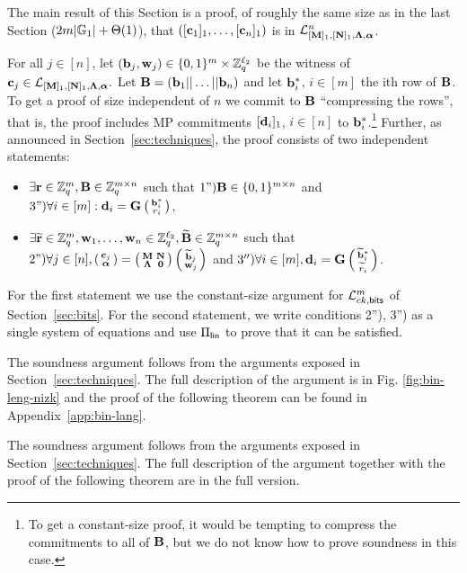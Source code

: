 The main result of this Section is a proof, of roughly the same size as in the last Section ($2{m}|\mathbb{G}_1|+\Theta(1)$), that  $([\mathbf{c}_1]_1,\ldots,[\mathbf{c}_n]_1)$ is in $\mathcal{L}_{[\mathbf{{M}}]_1,[\mathbf{{N}}]_1,\mathbf{{\Lambda}},{\boldsymbol \alpha}}^n$.

For all $j \in [n]$, let $(\mathbf{b}_j,\mathbf{w}_j) \in \{0,1\}^{{m}} \times \mathbb{Z}_q^{{\ell_2}}$ be the witness of $\mathbf{c}_j \in \mathcal{L}_{[\mathbf{{M}}]_1,[\mathbf{{N}}]_1,\mathbf{{\Lambda}},{\boldsymbol \alpha}}.$ Let $\mathbf{{B}}=(\mathbf{b}_1|| \ldots ||\mathbf{b}_n)$ and let $\mathbf{b}^*_{i}$, $i \in [m]$ the ith row of $\mathbf{{B}}$. To get a proof of size independent of $n$ we commit to $\mathbf{{B}}$ ``compressing the rows'', that is, the proof includes MP commitments $[\mathbf{d}_i]_1$, $i \in [n]$ to $\mathbf{b}_i^*$.\footnote{To get a constant-size proof, it would be tempting to compress the commitments to all of $\mathbf{{B}}$, but we do not know how to prove soundness in this case.} Further, as announced in Section~\ref{sec:techniques}, the proof consists of two independent statements:
\begin{itemize}
\item $\exists \mathbf{r} \in \mathbb{Z}_q^{m}, \mathbf{{B}} \in \mathbb{Z}_q^{{m} \times n}$ such that  
$\text{1'')} \mathbf{{B}} \in \{0,1\}^{{m} \times n}$ and $\text{3'')} \forall i \in [{m}]: \mathbf{d}_i=\mathbf{{G}}\left(\begin{smallmatrix}\mathbf{b}_i^*  \\ r_i\end{smallmatrix}\right)$,
\item $\exists \widetilde{\mathbf{r}} \in \mathbb{Z}_q^{m}, \mathbf{w}_1,\ldots,\mathbf{w}_n \in\mathbb{Z}_q^{\ell_2}, \widetilde{\mathbf{{B}}} \in \mathbb{Z}_q^{{m} \times n}$ such that  
   $\text{2'')}\forall j \in [n], \left(\begin{smallmatrix}
    \mathbf{c}_j\\
    {\boldsymbol \alpha}
\end{smallmatrix}\right)
=
\left(\begin{smallmatrix}
    \mathbf{{M}}       & \mathbf{{N}}\\
    \mathbf{{\Lambda}} & \mathbf{{0}}
\end{smallmatrix}\right)
\left(\begin{smallmatrix}
    \widetilde{\mathbf{b}}_j\\
    \mathbf{w}_j
\end{smallmatrix}\right)$ and $3'') \forall i \in [{m}], \mathbf{d}_i=\mathbf{{G}}   \left(\begin{smallmatrix}\widetilde{\mathbf{b}}^*_i  \\ \widetilde{r}_i\end{smallmatrix}\right)  $.
\end{itemize} 
For the first statement we use the constant-size argument for $\mathcal{L}_{ck,\mathsf{bits}}^m$ of Section~\ref{sec:bits}. For the second statement, we write conditions 2''), 3'') as a single system of equations and use $\Pi_{\mathsf{lin}}$ to prove that it can be satisfied. 

\iffull
The soundness argument follows from the arguments exposed in Section~\ref{sec:techniques}. The full description of the argument is in Fig. \ref{fig:bin-leng-nizk} and the proof of the following theorem can be found in Appendix~\ref{app:bin-lang}.

\else
The soundness argument follows from the arguments exposed in Section~\ref{sec:techniques}. The full description of the argument together with the proof of the following theorem are in the full version.
\fi

